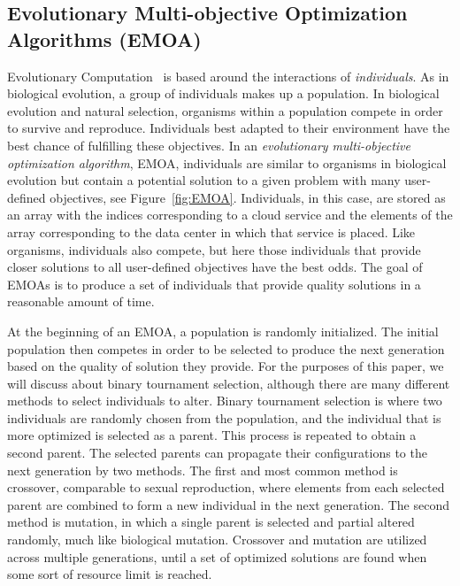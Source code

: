 \documentclass{sig-alternate}
\begin{document}
\subsection{Evolutionary Multi-objective Optimization Algorithms (EMOA)}
\label{sec:EMOA}

Evolutionary Computation~\cite{poli08:fieldguide} is based around the interactions of \emph{individuals}.  As in biological evolution, a group of individuals makes up a population. In biological evolution and natural selection, organisms within a population compete in order to survive and reproduce. Individuals best adapted to their environment have the best chance of fulfilling these objectives. In an \emph{evolutionary multi-objective optimization algorithm}, EMOA, individuals are similar to organisms in biological evolution but contain a potential solution to a given problem with many user-defined objectives, see Figure~\ref{fig:EMOA}. Individuals, in this case, are stored as an array with the indices corresponding to a cloud service and the elements of the array corresponding to the data center in which that service is placed.  Like organisms, individuals also compete, but here those individuals that provide closer solutions to all user-defined objectives have the best odds. The goal of EMOAs is to produce a set of individuals that provide quality solutions in a reasonable amount of time. 

At the beginning of an EMOA, a population is randomly initialized. The initial population then competes in order to be selected to produce the next generation based on the quality of solution they provide. For the purposes of this paper, we will discuss about binary tournament selection, although there are many different methods to select individuals to alter. Binary tournament selection is where two individuals are randomly chosen from the population, and the individual that is more optimized is selected as a parent. This process is repeated to obtain a second parent.  The selected parents can propagate their configurations to the next generation by two methods. The first and most common method is crossover, comparable to sexual reproduction, where elements from each selected parent are combined to form a new individual in the next generation. The second method is mutation, in which a single parent is selected and partial altered randomly, much like biological mutation. Crossover and mutation are utilized across multiple generations, until a set of optimized solutions are found when some sort of resource limit is reached. %
\end{document}
